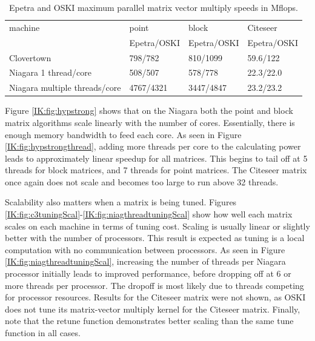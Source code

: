 \begin{table}[htbp]
\begin{center}
\begin{tabular}{|l|l|l|l|}
\hline
machine & point & block & Citeseer \\
 & Epetra/OSKI & Epetra/OSKI & Epetra/OSKI \\
\hline
Clovertown &  798/782 & 810/1099 & 59.6/122  \\
Niagara 1 thread/core & 508/507 & 578/778 & 22.3/22.0\\
Niagara multiple threads/core & 4767/4321 & 3447/4847 & 23.2/23.2 \\
\hline
\end{tabular}
\caption{Epetra and OSKI maximum parallel matrix vector multiply speeds in Mflops.}
\label{IK:fig:parrallelnums}
\end{center}
\end{table}


Figure \ref{IK:fig:hypstrong} shows that on the Niagara both the point and block matrix algorithms scale linearly with the number
of cores.  Essentially, there is enough memory bandwidth to feed each core.  As seen in Figure \ref{IK:fig:hypstrongthread},
 adding more threads per core to the calculating power leads to approximately linear speedup for all matrices.
This begins to tail off at 5 threads for block matrices, and 7 threads for point matrices.  The Citeseer matrix once
again does not scale and becomes too large to run above 32 threads.

Scalability also matters when a matrix is being tuned.  Figures
\ref{IK:fig:c3tuningScal}-\ref{IK:fig:niagthreadtuningScal} show
how well each matrix scales on each machine in terms of tuning cost.  Scaling is usually
linear or slightly better with the number of processors.  This result is expected as tuning is
a local computation with no communication between processors.  As seen in Figure \ref{IK:fig:niagthreadtuningScal},
increasing
the number of threads per Niagara processor initially leads to improved performance, before dropping off at 6
or  more threads per processor.
The dropoff is most likely due to threads competing for processor resources.  Results for the Citeseer matrix were
not shown, as OSKI does not tune its matrix-vector multiply kernel for the Citeseer matrix.  Finally, note
that the retune function demonstrates better scaling than the same tune function in all cases.

